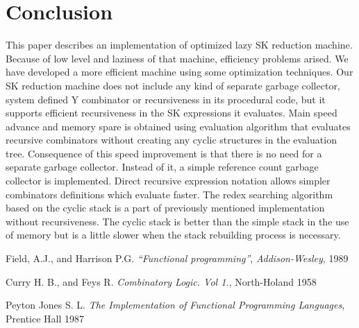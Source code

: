 \documentclass{article}
\begin{document}
\section{Conclusion}
This paper describes an implementation of optimized lazy SK reduction
machine. Because of low level and laziness of that machine, efficiency
problems arised. We have developed a more efficient machine using some
optimization techniques. Our SK reduction machine does not include any
kind of separate garbage collector, system defined Y combinator or
recursiveness in its procedural code, but it supports efficient
recursiveness in the SK expressions it evaluates. Main speed advance and
memory spare is obtained using evaluation algorithm that evaluates
recursive combinators without creating any cyclic structures in the
evaluation tree. Consequence of this speed improvement is that there is
no need for a separate garbage collector. Instead of it, a simple
reference count garbage collector is implemented.  Direct recursive
expression notation allows simpler combinators definitions which
evaluate faster.  The redex searching algorithm based on the cyclic
stack is a part of previously mentioned implementation without
recursiveness. The cyclic stack is better than the simple stack in the
use of memory but is a little slower when the stack rebuilding process
is necessary.
\begin{thebibliography}{9}
Field, A.J., and Harrison P.G.
{\em ``Functional programming''},
{\em Addison-Wesley}, 1989

Curry H. B., and Feys R.
{\em Combinatory Logic. Vol 1.},
North-Holand 1958

Peyton Jones S. L.
{\em The Implementation of Functional Programming Languages},
Prentice Hall 1987
\end{thebibliography}
\end{document}
